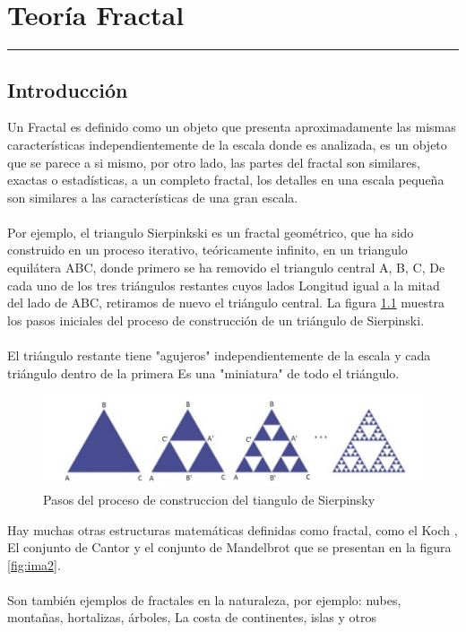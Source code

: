 
\chapter{Teoría Fractal}
\hrule \bigskip \vspace*{1cm}



\section{Introducción}

Un Fractal es definido como un objeto que presenta aproximadamente las mismas características
independientemente de la escala donde es analizada, es un objeto que se parece a si mismo, por otro lado, las partes del fractal son similares, exactas o estadísticas, a un completo fractal, los detalles en una escala pequeña son similares a las características de una gran escala.
\\\\
Por ejemplo, el triangulo Sierpinkski es un fractal geométrico, que ha sido construido en un proceso iterativo, teóricamente infinito, en un triangulo equilátera ABC, donde primero se ha removido el triangulo central A, B, C,  De cada uno de los tres triángulos restantes cuyos lados
Longitud igual a la mitad del lado de ABC, retiramos de nuevo el triángulo central. La figura \ref{fig:ima1} muestra los pasos iniciales del proceso de construcción de un triángulo de Sierpinski.
\\\\
El triángulo restante tiene "agujeros" independientemente de la escala y cada triángulo dentro de la primera
Es una "miniatura" de todo el triángulo.

\begin{figure}[h]
\centering
\includegraphics[scale=0.75]{chapter4/ima1.png}
\caption{Pasos del proceso de construccion del tiangulo de Sierpinsky}
\label{fig:ima1}
\end{figure}

Hay muchas otras estructuras matemáticas definidas como fractal, como el Koch
, El conjunto de Cantor y el conjunto de Mandelbrot que se presentan en la figura \ref{fig:ima2}.
\\\\
Son también ejemplos de fractales en la naturaleza, por ejemplo: nubes, montañas, hortalizas, árboles,
La costa de continentes, islas y otros

